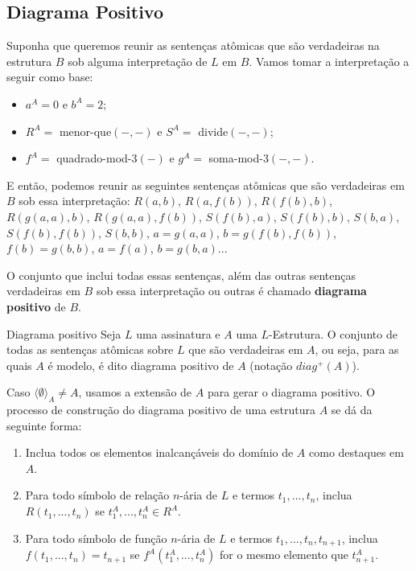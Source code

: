 \subsection{Diagrama Positivo}
Suponha que queremos reunir as sentenças atômicas que são verdadeiras na estrutura $B$ sob alguma interpretação de $L$ em $B$. Vamos tomar a interpretação a seguir como base:
\begin{itemize}
    \item $a^A = 0$ e $b^A = 2$;
    \item $R^A =$ menor-que$(-,-)$ e $S^A =$ divide$(-,-)$;
    \item $f^A =$ quadrado-mod-3$(-)$ e $g^A =$ soma-mod-3$(-,-)$.
\end{itemize}
E então, podemos reunir as seguintes sentenças atômicas que são verdadeiras em $B$ sob essa interpretação: $R(a,b)$, $R(a, f(b))$, $R(f(b), b)$, $R(g(a,a), b)$, $R(g(a,a), f(b))$, $S(f(b), a)$, $S(f(b), b)$, $S(b, a)$, $S(f(b),f(b))$, $S(b,b)$, $a = g(a,a)$, $b = g(f(b),f(b))$, $f(b) = g(b,b)$, $a = f(a)$, $b = g(b, a)$...

O conjunto que inclui todas essas sentenças, além das outras sentenças verdadeiras em $B$ sob essa interpretação ou outras é chamado \textbf{diagrama positivo} de $B$.
\begin{definition}{Diagrama positivo}
    Seja $L$ uma assinatura e $A$ uma $L$-Estrutura. O conjunto de todas as sentenças atômicas sobre $L$ que são verdadeiras em $A$, ou seja, para as quais $A$ é modelo, é dito diagrama positivo de $A$ (notação $diag^+(A)$).

    Caso $\langle \emptyset\rangle_A \neq A$, usamos a extensão de $A$ para gerar o diagrama positivo.
    O processo de construção do diagrama positivo de uma estrutura $A$ se dá da seguinte forma:
    \begin{enumerate}
        \item Inclua todos os elementos inalcançáveis do domínio de $A$ como destaques em $A$.
        \item Para todo símbolo de relação $n$-ária de $L$ e termos $t_1,...,t_n$, inclua $R(t_1,...,t_n)$ se $t_1^A,...,t_n^A \in R^A$.
        \item Para todo símbolo de função $n$-ária de $L$ e termos $t_1,...,t_n,t_{n+1}$, inclua $f(t_1,...,t_n) = t_{n+1}$ se $f^A(t_1^A,...,t_n^A)$ for o mesmo elemento que $t_{n+1}^A$.
    \end{enumerate}
\end{definition}